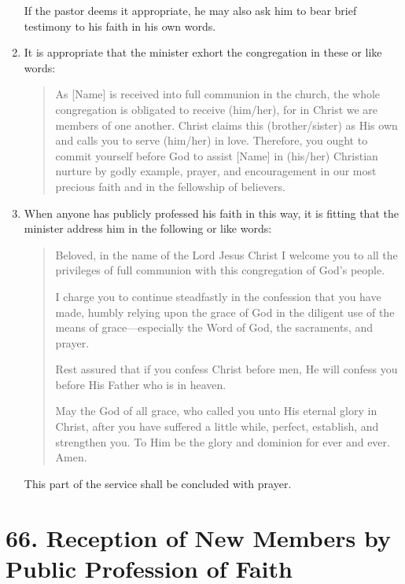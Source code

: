 \documentclass[
]{book}
\begin{document}
\begin{enumerate}
  If the pastor deems it appropriate, he may also ask him to bear brief testimony to his faith in his own words.
\item
  It is appropriate that the minister exhort the congregation in these or like words:

  \begin{quote}
  As {[}Name{]} is received into full communion in the church, the whole congregation is obligated to receive (him/her), for in Christ we are members of one another. Christ claims this (brother/sister) as His own and calls you to serve (him/her) in love. Therefore, you ought to commit yourself before God to assist {[}Name{]} in (his/her) Christian nurture by godly example, prayer, and encouragement in our most precious faith and in the fellowship of believers.
  \end{quote}
\item
  When anyone has publicly professed his faith in this way, it is fitting that the minister address him in the following or like words:

  \begin{quote}
  Beloved, in the name of the Lord Jesus Christ I welcome you to all the privileges of full communion with this congregation of God's people.

  I charge you to continue steadfastly in the confession that you have made, humbly relying upon the grace of God in the diligent use of the means of grace---especially the Word of God, the sacraments, and prayer.

  Rest assured that if you confess Christ before men, He will confess you before His Father who is in heaven.

  May the God of all grace, who called you unto His eternal glory in Christ, after you have suffered a little while, perfect, establish, and strengthen you. To Him be the glory and dominion for ever and ever. Amen.
  \end{quote}

  This part of the service shall be concluded with prayer.
\end{enumerate}

\hypertarget{reception-of-new-members-by-public-profession-of-faith}{%
\section*{66. Reception of New Members by Public Profession of Faith}\label{reception-of-new-members-by-public-profession-of-faith}}
\end{document}

